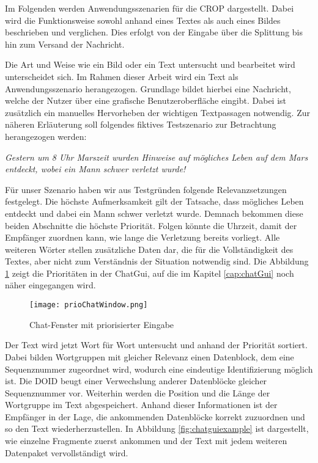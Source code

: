 \label{sec:Anwendungsszenarien}

Im Folgenden werden Anwendungsszenarien für die \gls{CROP} dargestellt. Dabei
wird die Funktionsweise sowohl anhand eines Textes als auch eines Bildes beschrieben und
verglichen. Dies erfolgt von der Eingabe über die Splittung bis hin zum Versand
der Nachricht.

Die Art und Weise wie ein Bild oder ein Text untersucht und bearbeitet wird
unterscheidet sich. Im Rahmen dieser Arbeit wird ein Text als
Anwendungsszenario herangezogen. Grundlage bildet hierbei eine Nachricht,
welche der Nutzer über eine grafische Benutzeroberfläche eingibt.
Dabei ist zusätzlich ein manuelles Hervorheben der wichtigen Textpassagen
notwendig. Zur näheren Erläuterung soll folgendes fiktives Testszenario zur
Betrachtung herangezogen werden:

\textit{\glqq Gestern um 8 Uhr Marszeit wurden Hinweise auf mögliches Leben auf
dem Mars entdeckt, wobei ein Mann schwer verletzt wurde! \grqq}

Für unser Szenario haben wir aus Testgründen folgende Relevanzsetzungen
festgelegt. Die höchste Aufmerksamkeit gilt der Tatsache, dass mögliches Leben
entdeckt und dabei ein Mann schwer verletzt wurde. Demnach bekommen diese beiden
Abschnitte die höchste Priorität. Folgen könnte die Uhrzeit, damit der Empfänger
zuordnen kann, wie lange die Verletzung bereits vorliegt. Alle weiteren Wörter
stellen zusätzliche Daten dar, die für die Vollständigkeit des Textes, aber
nicht zum Verständnis der Situation notwendig sind. Die Abbildung
\ref{fig:prioChatWindow} zeigt die Prioritäten in der ChatGui, auf die im
Kapitel \ref{cap:chatGui} noch näher eingegangen wird.

\begin{figure}[H]
	\centering
	\texttt{[image: prioChatWindow.png]}
	\caption{Chat-Fenster mit priorisierter Eingabe}
	\label{fig:prioChatWindow}
\end{figure}

Der Text wird jetzt Wort für Wort untersucht und anhand der Priorität sortiert.
Dabei bilden Wortgruppen mit gleicher Relevanz einen Datenblock, dem eine
Sequenznummer zugeordnet wird, wodurch eine eindeutige Identifizierung möglich
ist. Die \gls{DOID} beugt einer Verwechslung anderer Datenblöcke gleicher
Sequenznummer vor. Weiterhin werden die Position und die Länge der Wortgruppe im
Text abgespeichert. Anhand dieser Informationen ist der Empfänger in der Lage,
die ankommenden Datenblöcke korrekt zuzuordnen und so den Text
wiederherzustellen.
In Abbildung \ref{fig:chatguiexample} ist dargestellt, wie einzelne Fragmente
zuerst ankommen und der Text mit jedem weiteren Datenpaket vervollständigt wird.

